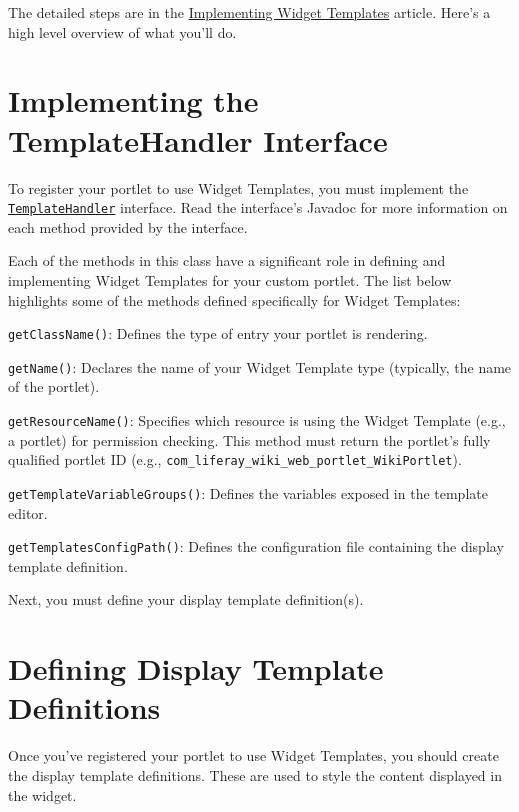 The detailed steps are in the
\href{/docs/7-2/customization/-/knowledge_base/c/implementing-widget-templates}{Implementing
Widget Templates} article. Here's a high level overview of what you'll
do.

\section{Implementing the TemplateHandler
Interface}\label{implementing-the-templatehandler-interface}

To register your portlet to use Widget Templates, you must implement the
\href{https://docs.liferay.com/dxp/portal/7.2-latest/javadocs/portal-kernel/com/liferay/portal/kernel/template/TemplateHandler.html}{\texttt{TemplateHandler}}
interface. Read the interface's Javadoc for more information on each
method provided by the interface.

Each of the methods in this class have a significant role in defining
and implementing Widget Templates for your custom portlet. The list
below highlights some of the methods defined specifically for Widget
Templates:

\texttt{getClassName()}: Defines the type of entry your portlet is
rendering.

\texttt{getName()}: Declares the name of your Widget Template type
(typically, the name of the portlet).

\texttt{getResourceName()}: Specifies which resource is using the Widget
Template (e.g., a portlet) for permission checking. This method must
return the portlet's fully qualified portlet ID (e.g.,
\texttt{com\_liferay\_wiki\_web\_portlet\_WikiPortlet}).

\texttt{getTemplateVariableGroups()}: Defines the variables exposed in
the template editor.

\texttt{getTemplatesConfigPath()}: Defines the configuration file
containing the display template definition.

Next, you must define your display template definition(s).

\section{Defining Display Template
Definitions}\label{defining-display-template-definitions}

Once you've registered your portlet to use Widget Templates, you should
create the display template definitions. These are used to style the
content displayed in the widget.

